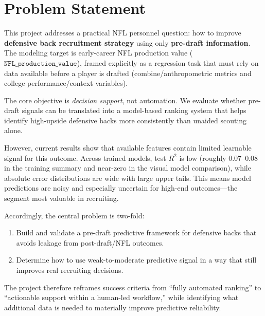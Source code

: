 \section{Problem Statement}

This project addresses a practical NFL personnel question: how to improve \textbf{defensive back recruitment strategy} using only \textbf{pre-draft information}. The modeling target is early-career NFL production value ($\texttt{NFL\_production\_value}$), framed explicitly as a regression task that must rely on data available before a player is drafted (combine/anthropometric metrics and college performance/context variables).

The core objective is \emph{decision support}, not automation. We evaluate whether pre-draft signals can be translated into a model-based ranking system that helps identify high-upside defensive backs more consistently than unaided scouting alone.

However, current results show that available features contain limited learnable signal for this outcome. Across trained models, test $R^2$ is low (roughly $0.07$--$0.08$ in the training summary and near-zero in the visual model comparison), while absolute error distributions are wide with large upper tails. This means model predictions are noisy and especially uncertain for high-end outcomes---the segment most valuable in recruiting.

Accordingly, the central problem is two-fold:
\begin{enumerate}
    \item Build and validate a pre-draft predictive framework for defensive backs that avoids leakage from post-draft/NFL outcomes.
    \item Determine how to use weak-to-moderate predictive signal in a way that still improves real recruiting decisions.
\end{enumerate}

The project therefore reframes success criteria from ``fully automated ranking'' to ``actionable support within a human-led workflow,'' while identifying what additional data is needed to materially improve predictive reliability.
